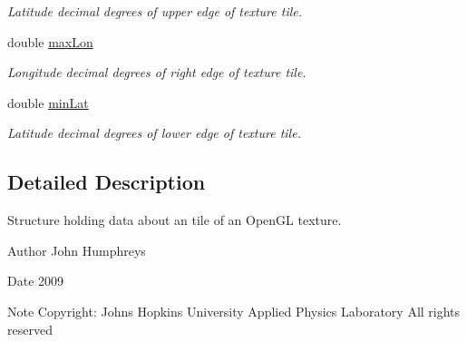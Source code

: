 \begin{DoxyCompactItemize}
\begin{DoxyCompactList}\small\item\em Latitude decimal degrees of upper edge of texture tile. \end{DoxyCompactList}\item 
\hypertarget{structtexture_tile_a067275141570493c8cb552ef5e003c62}{
double \hyperlink{structtexture_tile_a067275141570493c8cb552ef5e003c62}{maxLon}}
\label{structtexture_tile_a067275141570493c8cb552ef5e003c62}

\begin{DoxyCompactList}\small\item\em Longitude decimal degrees of right edge of texture tile. \end{DoxyCompactList}\item 
\hypertarget{structtexture_tile_a6a892a21c891cc9f6b4c3d8622b5f494}{
double \hyperlink{structtexture_tile_a6a892a21c891cc9f6b4c3d8622b5f494}{minLat}}
\label{structtexture_tile_a6a892a21c891cc9f6b4c3d8622b5f494}

\begin{DoxyCompactList}\small\item\em Latitude decimal degrees of lower edge of texture tile. \end{DoxyCompactList}\end{DoxyCompactItemize}


\subsection{Detailed Description}
Structure holding data about an tile of an OpenGL texture. 

\begin{DoxyAuthor}{Author}
John Humphreys 
\end{DoxyAuthor}
\begin{DoxyDate}{Date}
2009 
\end{DoxyDate}
\begin{DoxyNote}{Note}
Copyright: Johns Hopkins University Applied Physics Laboratory All rights reserved 
\end{DoxyNote}


